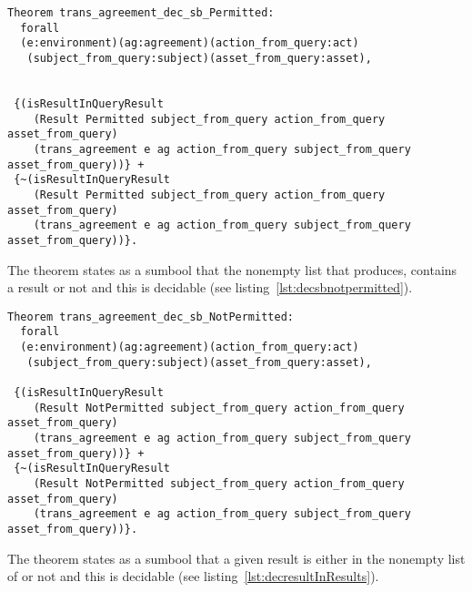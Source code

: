 \begin{lstlisting}
Theorem trans_agreement_dec_sb_Permitted:
  forall
  (e:environment)(ag:agreement)(action_from_query:act)
   (subject_from_query:subject)(asset_from_query:asset),


 {(isResultInQueryResult 
    (Result Permitted subject_from_query action_from_query asset_from_query)
    (trans_agreement e ag action_from_query subject_from_query asset_from_query))} +
 {~(isResultInQueryResult 
    (Result Permitted subject_from_query action_from_query asset_from_query)
    (trans_agreement e ag action_from_query subject_from_query asset_from_query))}.

\end{lstlisting}

The theorem  states as a sumbool that the nonempty list that  produces, contains a  result or not and this is decidable (see listing~\ref{lst:decsbnotpermitted}).

\begin{lstlisting}
Theorem trans_agreement_dec_sb_NotPermitted:
  forall
  (e:environment)(ag:agreement)(action_from_query:act)
   (subject_from_query:subject)(asset_from_query:asset),

 {(isResultInQueryResult 
    (Result NotPermitted subject_from_query action_from_query asset_from_query)
    (trans_agreement e ag action_from_query subject_from_query asset_from_query))} +
 {~(isResultInQueryResult 
    (Result NotPermitted subject_from_query action_from_query asset_from_query)
    (trans_agreement e ag action_from_query subject_from_query asset_from_query))}.

\end{lstlisting}

The theorem  states as a sumbool that a given result is either in the nonempty list of  or not and this is decidable (see listing~\ref{lst:decresultInResults}).

